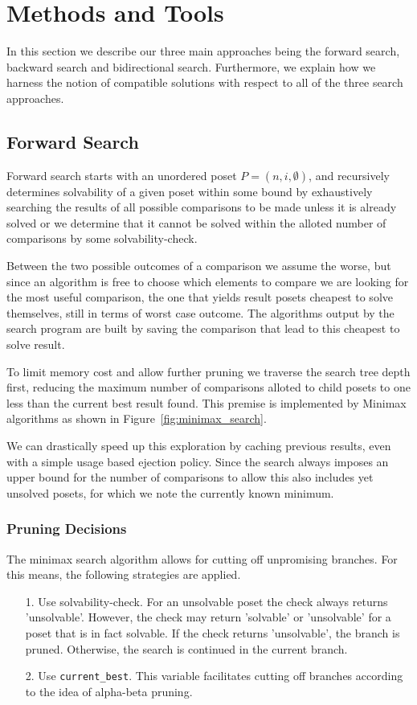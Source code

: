 \documentclass[10pt,journal,compsoc]{IEEEtran}
\begin{document}
\section{Methods and Tools}
In this section we describe our three main approaches being the forward search, backward search and bidirectional search.
Furthermore, we explain how we harness the notion of compatible solutions with respect to all of the three search approaches.

\subsection{Forward Search}\label{chapter:forward_search}
Forward search starts with an unordered poset $P=(n,i,\emptyset)$, and recursively determines solvability of a given poset within some bound by exhaustively searching the results of all possible comparisons to be made unless it is already solved or we determine that it cannot be solved within the alloted number of comparisons by some solvability-check.

Between the two possible outcomes of a comparison we assume the worse, but since an algorithm is free to choose which elements to compare we are looking for the most useful comparison, the one that yields result posets cheapest to solve themselves, still in terms of worst case outcome.
The algorithms output by the search program are built by saving the comparison that lead to this cheapest to solve result.

To limit memory cost and allow further pruning we traverse the search tree depth first, reducing the maximum number of comparisons alloted to child posets to one less than the current best result found.
This premise is implemented by Minimax algorithms as shown in Figure~\ref{fig:minimax_search}.

We can drastically speed up this exploration by caching previous results, even with a simple usage based ejection policy. Since the search always imposes an upper bound for the number of comparisons to allow this also includes yet unsolved posets, for which we note the currently known minimum.

\subsubsection{Pruning Decisions}
The minimax search algorithm allows for cutting off unpromising branches.
For this means, the following strategies are applied.

\begin{enumerate}
  \item[1.]
    Use solvability-check. For an unsolvable poset the check always returns 'unsolvable'.
    However, the check may return 'solvable' or 'unsolvable' for a poset that is in fact solvable.
    If the check returns 'unsolvable', the branch is pruned.
    Otherwise, the search is continued in the current branch.
  \item[2.]
    Use \texttt{current\_best}. This variable facilitates cutting off branches according to the idea of alpha-beta pruning.
\end{enumerate}
\end{document}
